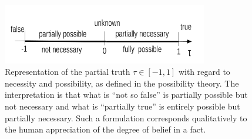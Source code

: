 \documentclass[sn-mathphys]{sn-jnl}
\begin{document}
\begin{figure}[htbp]
\centerline{\includegraphics[width=0.8\textwidth]{./possibility-necessity.png}}
\caption{Representation of the partial truth $\tau \in [-1,1]$ with regard to necessity and possibility, as defined in the possibility theory. The interpretation is that what is ``not so false'' is partially possible but not necessary and what is ``partially true'' is entirely possible but partially necessary. Such a formulation corresponds qualitatively to the human appreciation of the degree of belief in a fact.}
\label{possibility-necessity}
\end{figure}
\end{document}
